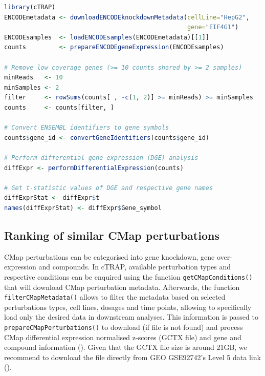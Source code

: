 \begin{lstlisting}[caption=Code to obtain example dataset \texttt{diffExprStat}.,language=R,label={lst:diffExprStat}]
library(cTRAP)
ENCODEmetadata <- downloadENCODEknockdownMetadata(cellLine="HepG2",
                                                  gene="EIF4G1")
ENCODEsamples  <- loadENCODEsamples(ENCODEmetadata)[[1]]
counts         <- prepareENCODEgeneExpression(ENCODEsamples)

# Remove low coverage genes (>= 10 counts shared by >= 2 samples)
minReads   <- 10
minSamples <- 2
filter     <- rowSums(counts[ , -c(1, 2)] >= minReads) >= minSamples
counts     <- counts[filter, ]

# Convert ENSEMBL identifiers to gene symbols
counts$gene_id <- convertGeneIdentifiers(counts$gene_id)

# Perform differential gene expression (DGE) analysis
diffExpr <- performDifferentialExpression(counts)

# Get t-statistic values of DGE and respective gene names
diffExprStat <- diffExpr$t
names(diffExprStat) <- diffExpr$Gene_symbol
\end{lstlisting}

\subsection{Ranking of similar CMap perturbations}

CMap perturbations can be categorised into gene knockdown, gene over-expression and compounds. In cTRAP, available perturbation types and respective conditions can be enquired using the function \texttt{getCMapConditions()} that will download CMap perturbation metadata. Afterwards, the function \texttt{filterCMapMetadata()} allows to filter the metadata based on selected perturbations types, cell lines, dosages and time points, allowing to specifically load only the desired data in downstream analyses. This information is passed to \texttt{prepareCMapPerturbations()} to download (if file is not found) and process CMap differential expression normalised z-scores (GCTX file) and gene and compound information (). Given that the GCTX file size is around 21GB, we recommend to download the file directly from GEO GSE92742’s Level 5 data link ().

